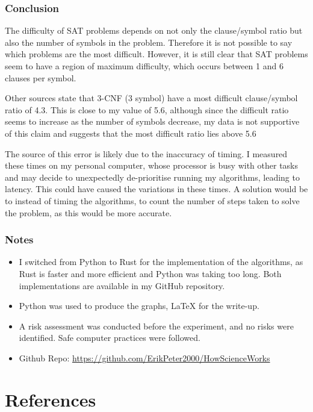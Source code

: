 \documentclass{article}
\begin{document}
    \subsubsection{Conclusion}
    
    The difficulty of SAT problems depends on not only the clause/symbol ratio but also the number of symbols in the problem. Therefore it is not possible to say which problems are the most difficult. However, it is still clear that SAT problems seem to have a region of maximum difficulty, which occurs between 1 and 6 clauses per symbol.

    Other sources state that 3-CNF (3 symbol) have a most difficult clause/symbol ratio of 4.3.\supercite{Norvig_2021} This is close to my value of 5.6, although since the difficult ratio seems to increase as the number of symbols decrease, my data is not supportive of this claim and suggests that the most difficult ratio lies above 5.6

    The source of this error is likely due to the inaccuracy of timing. I measured these times on my personal computer, whose processor is busy with other tasks and may decide to unexpectedly de-prioritise running my algorithms, leading to latency. This could have caused the variations in these times. A solution would be to instead of timing the algorithms, to count the number of steps taken to solve the problem, as this would be more accurate.

    \subsubsection{Notes}

    \begin{itemize}
        \item I switched from Python to Rust\supercite{rust-lang} for the implementation of the algorithms, as Rust is faster and more efficient and Python was taking too long. Both implementations are available in my GitHub repository.
        \item Python was used to produce the graphs, LaTeX for the write-up.
        \item A risk assessment was conducted before the experiment, and no risks were identified. Safe computer practices were followed.
        \item Github Repo: \url{https://github.com/ErikPeter2000/HowScienceWorks}
    \end{itemize}

    \section{References}
    \printbibliography[heading=none]
\end{document}
